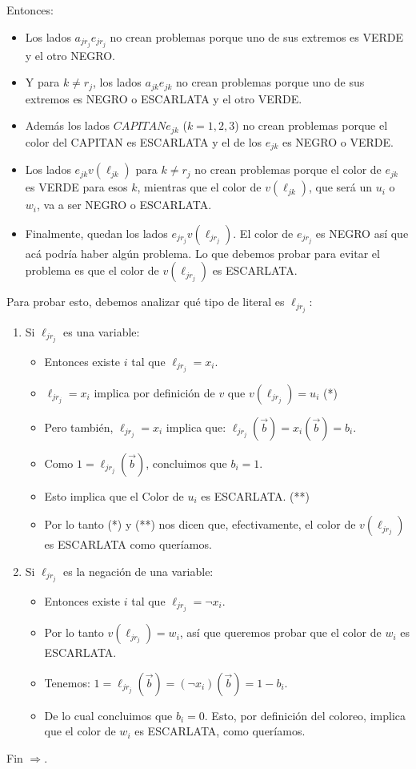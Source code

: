 \documentclass[11pt, a4paper]{article}
\theoremstyle{definition}
\begin{document}
Entonces:
\begin{itemize}
    \item Los lados $a_{jr_j}e_{jr_j}$ no crean problemas porque uno de sus extremos es VERDE y el otro NEGRO.
    \item Y para $k \neq r_j$, los lados $a_{jk}e_{jk}$ no crean problemas porque uno de sus extremos es NEGRO o ESCARLATA y el otro VERDE.
    \item Además los lados $CAPITAN e_{jk}$ ($k = 1, 2, 3$) no crean problemas porque el color del CAPITAN es ESCARLATA y el de los $e_{jk}$ es NEGRO o VERDE.
    \item Los lados $e_{jk}v(\ell_{jk})$ para $k \neq r_j$ no crean problemas porque el color de $e_{jk}$ es VERDE para esos $k$, mientras que el color
    de $v(\ell_{jk})$, que será un $u_i$ o $w_i$, va a ser NEGRO o ESCARLATA.
    \item Finalmente, quedan los lados $e_{jr_j}v(\ell_{jr_j})$. El color de $e_{jr_j}$ es NEGRO así que acá podría haber algún problema. Lo que
    debemos probar para evitar el problema es que el color de $v(\ell_{jr_j})$ es ESCARLATA.
\end{itemize}
Para probar esto, debemos analizar qué tipo de literal es $\ell_{jr_j}$:
\begin{enumerate}
    \item Si $\ell_{jr_j}$ es una variable:\\
    \begin{itemize}
        \item Entonces existe $i$ tal que $\ell_{jr_j} = x_i$.
        \item $\ell_{jr_j} = x_i$ implica por definición de $v$ que $v(\ell_{jr_j}) = u_i$ (*)
        \item Pero también, $\ell_{jr_j} = x_i$ implica que: $\ell_{jr_j}(\vec{b}) = x_i(\vec{b}) = b_i$.
        \item Como $1 = \ell_{jr_j}(\vec{b})$, concluimos que $b_i = 1$.
        \item Esto implica que el Color de $u_i$ es ESCARLATA. (**)
        \item Por lo tanto (*) y (**) nos dicen que, efectivamente, el color de $v(\ell_{jr_j})$ es ESCARLATA como queríamos.
    \end{itemize}
    \item Si $\ell_{jr_j}$ es la negación de una variable:
    \begin{itemize}
        \item Entonces existe $i$ tal que $\ell_{jr_j} = \neg x_i$.
        \item Por lo tanto $v(\ell_{jr_j}) = w_i$, así que queremos probar que el color de $w_i$ es ESCARLATA.
        \item  Tenemos: $1 = \ell_{jr_j}(\vec{b}) = (\neg x_i)(\vec{b}) = 1 - b_i$.
        \item  De lo cual concluimos que $b_i = 0$. Esto, por definición del coloreo, implica que el color de $w_i$ es ESCARLATA, como
        queríamos.
    \end{itemize}
\end{enumerate}
Fin $\Rightarrow$.
\end{document}
